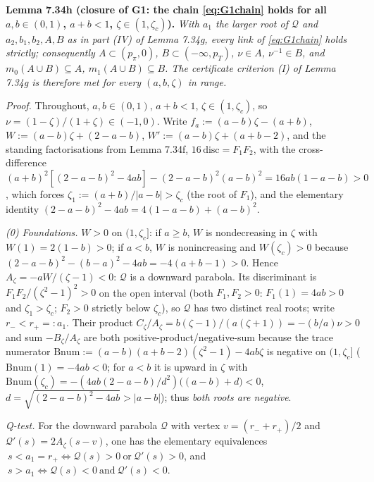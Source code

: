 \documentclass[
]{article}
\begin{document}
\textbf{Lemma 7.34h (closure of G1: the chain \eqref{eq:G1chain} holds for all
$a,b\in(0,1)$, $a+b<1$, $\zeta\in(1,\zeta_c)$).} \emph{With $a_1$ the larger
root of $\mathcal Q$ and $a_2,b_1,b_2,A,B$ as in part (IV) of Lemma 7.34g,
every link of \eqref{eq:G1chain} holds strictly; consequently $A\subset
(p_\pi,0)$, $B\subset(-\infty,p_T)$, $\nu\in A$, $\nu^{-1}\in B$, and $m_0(A\cup
B)\subseteq A$, $m_1(A\cup B)\subseteq B$. The certificate criterion {\rm(I)} of
Lemma 7.34g is therefore met for every $(a,b,\zeta)$ in range.}

\emph{Proof.} Throughout, $a,b\in(0,1)$, $a+b<1$, $\zeta\in(1,\zeta_c)$, so
$\nu=(1-\zeta)/(1+\zeta)\in(-1,0)$. Write
$f_a:=(a-b)\zeta-(a+b)$, $W:=(a-b)\zeta+(2-a-b)$,
$W':=(a-b)\zeta+(a+b-2)$, and the standing factorisations from Lemma 7.34f,
$16\,\mathrm{disc}=F_1F_2$, with the cross-difference
$(a+b)^2[(2-a-b)^2-4ab]-(2-a-b)^2(a-b)^2=16ab(1-a-b)>0$, which forces
$\zeta_1:=(a+b)/|a-b|>\zeta_c$ (the root of $F_1$), and the elementary
identity $(2-a-b)^2-4ab=4(1-a-b)+(a-b)^2$.

\emph{(0) Foundations.} $W>0$ on $(1,\zeta_c]$: if $a\ge b$, $W$ is
nondecreasing in $\zeta$ with $W(1)=2(1-b)>0$; if $a<b$, $W$ is nonincreasing
and $W(\zeta_c)>0$ because $(2-a-b)^2-(b-a)^2-4ab=-4(a+b-1)>0$. Hence
$A_\zeta=-aW/(\zeta-1)<0$: $\mathcal Q$ is a downward parabola. Its
discriminant is $F_1F_2/(\zeta^2-1)^2>0$ on the open interval (both $F_1,F_2>0$:
$F_1(1)=4ab>0$ and $\zeta_1>\zeta_c$; $F_2>0$ strictly below $\zeta_c$), so
$\mathcal Q$ has two distinct real roots; write $r_-<r_+=:a_1$. Their product
$C_\zeta/A_\zeta=b(\zeta-1)/(a(\zeta+1))=-(b/a)\nu>0$ and sum
$-B_\zeta/A_\zeta$ are both positive-product/negative-sum because the trace
numerator $\mathrm{Bnum}:=(a-b)(a+b-2)(\zeta^2-1)-4ab\zeta$ is negative on
$(1,\zeta_c]$ ($\mathrm{Bnum}(1)=-4ab<0$; for $a<b$ it is upward in $\zeta$ with
$\mathrm{Bnum}(\zeta_c)=-(4ab(2-a-b)/d^2)\bigl((a-b)+d\bigr)<0$,
$d=\sqrt{(2-a-b)^2-4ab}>|a-b|$); thus \emph{both roots are negative}.

\emph{Q-test.} For the downward parabola $\mathcal Q$ with vertex
$v=(r_-+r_+)/2$ and $\mathcal Q'(s)=2A_\zeta(s-v)$, one has the elementary
equivalences $\ s<a_1=r_+\iff \mathcal Q(s)>0\ \text{or}\ \mathcal Q'(s)>0$,
and $\ s>a_1\iff \mathcal Q(s)<0\ \text{and}\ \mathcal Q'(s)<0$.
\end{document}
